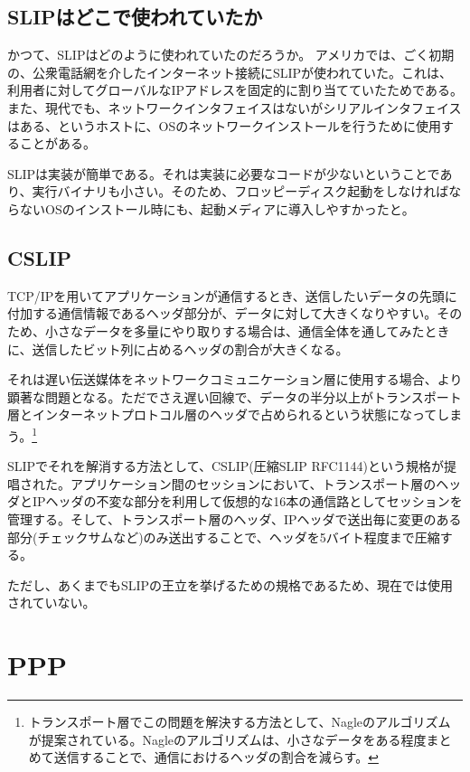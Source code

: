 \subsection{SLIPはどこで使われていたか}

かつて、SLIPはどのように使われていたのだろうか。
アメリカでは、ごく初期の、公衆電話網を介したインターネット接続にSLIPが使われていた。これは、利用者に対してグローバルなIPアドレスを固定的に割り当てていたためである。
また、現代でも、ネットワークインタフェイスはないがシリアルインタフェイスはある、というホストに、OSのネットワークインストールを行うために使用することがある。

SLIPは実装が簡単である。それは実装に必要なコードが少ないということであり、実行バイナリも小さい。そのため、フロッピーディスク起動をしなければならないOSのインストール時にも、起動メディアに導入しやすかったと。

\subsection{CSLIP}

TCP/IPを用いてアプリケーションが通信するとき、送信したいデータの先頭に付加する通信情報であるヘッダ部分が、データに対して大きくなりやすい。そのため、小さなデータを多量にやり取りする場合は、通信全体を通してみたときに、送信したビット列に占めるヘッダの割合が大きくなる。

それは遅い伝送媒体をネットワークコミュニケーション層に使用する場合、より顕著な問題となる。ただでさえ遅い回線で、データの半分以上がトランスポート層とインターネットプロトコル層のヘッダで占められるという状態になってしまう。\footnote{トランスポート層でこの問題を解決する方法として、Nagleのアルゴリズムが提案されている。Nagleのアルゴリズムは、小さなデータをある程度まとめて送信することで、通信におけるヘッダの割合を減らす。}

SLIPでそれを解消する方法として、CSLIP(圧縮SLIP RFC1144)という規格が提唱された。アプリケーション間のセッションにおいて、トランスポート層のヘッダとIPヘッダの不変な部分を利用して仮想的な16本の通信路としてセッションを管理する。そして、トランスポート層のヘッダ、IPヘッダで送出毎に変更のある部分(チェックサムなど)のみ送出することで、ヘッダを5バイト程度まで圧縮する。

ただし、あくまでもSLIPの王立を挙げるための規格であるため、現在では使用されていない。

\section{PPP}


